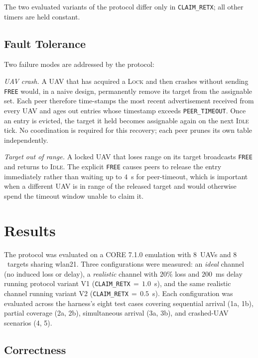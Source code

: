 \documentclass[11pt,letterpaper]{article}
\begin{document}
The two evaluated variants of the protocol differ only in
\texttt{CLAIM\_RETX}; all other timers are held constant.

\subsection{Fault Tolerance}
\label{sec:fault}

Two failure modes are addressed by the protocol:

\textit{UAV crash.} A UAV that has acquired a \textsc{Lock} and then
crashes without sending \texttt{FREE} would, in a naive design,
permanently remove its target from the assignable set. Each peer
therefore time-stamps the most recent advertisement received from every
UAV and ages out entries whose timestamp exceeds \texttt{PEER\_TIMEOUT}.
Once an entry is evicted, the target it held becomes assignable again
on the next \textsc{Idle} tick. No coordination is required for this
recovery; each peer prunes its own table independently.

\textit{Target out of range.} A locked UAV that loses range on its
target broadcasts \texttt{FREE} and returns to \textsc{Idle}. The
explicit \texttt{FREE} causes peers to release the entry immediately
rather than waiting up to $4$~s for peer-timeout, which is important
when a different UAV is in range of the released target and would
otherwise spend the timeout window unable to claim it.

\section{Results}

The protocol was evaluated on a CORE 7.1.0 emulation with $8$~UAVs and
$8$~targets sharing wlan21. Three configurations were measured: an
\textit{ideal} channel (no induced loss or delay), a \textit{realistic}
channel with $20\%$ loss and $200$~ms delay running protocol variant
V1 (\texttt{CLAIM\_RETX}\,$=\,1.0$~s), and the same realistic channel
running variant V2 (\texttt{CLAIM\_RETX}\,$=\,0.5$~s). Each
configuration was evaluated across the harness's eight test cases
covering sequential arrival (1a, 1b), partial coverage (2a, 2b),
simultaneous arrival (3a, 3b), and crashed-UAV scenarios (4, 5).

\subsection{Correctness}
\label{sec:correct}
\end{document}
